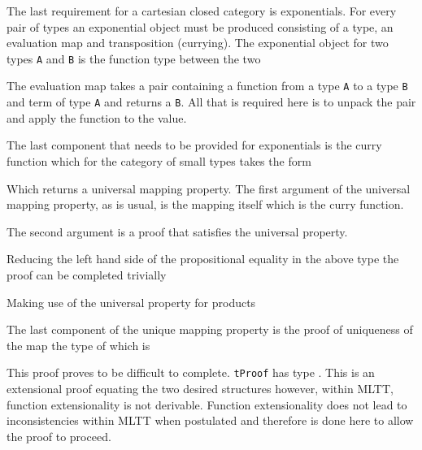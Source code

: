 

The last requirement for a cartesian closed category is exponentials. For every
pair of types an exponential object must be produced consisting of a type, an
evaluation map and transposition (currying). The exponential object for two
types \verb|A| and \verb|B| is the function type between the two


The evaluation map takes a pair containing a function from a type \verb|A| to a
type \verb|B| and term of type \verb|A| and returns a \verb|B|. All that is
required here is to unpack the pair and apply the function to the value.


The last component that needs to be provided for exponentials is the curry
function which for the category of small types takes the form


Which returns a universal mapping property. The first argument of the universal
mapping property, as is
usual, is the mapping itself which is the curry function.



The second argument is a proof that  satisfies the
universal property.


Reducing the left hand side of the propositional equality in the above type the
proof can be completed trivially


Making use of the universal property for products


The last component of the unique mapping property is the proof of uniqueness of
the map the type of which is


This proof proves to be difficult to complete. \verb|tProof| has type
. This is an extensional proof equating the two desired structures
however, within MLTT, function extensionality is not derivable. Function extensionality
does not lead to inconsistencies within MLTT when postulated and therefore is
done here to allow the proof to proceed.

